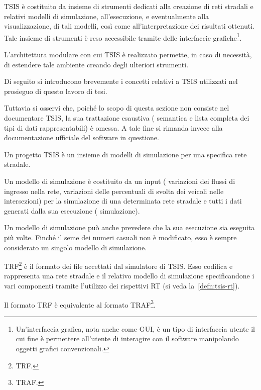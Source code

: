 \acs{TSIS} è costituito da insieme di strumenti dedicati alla creazione di reti stradali e relativi modelli di simulazione, all'esecuzione, e eventualmente alla visualizzazione, di tali modelli, così come all'interpretazione dei risultati ottenuti. Tale insieme di strumenti è reso accessibile tramite delle interfaccie grafiche\footnote{Un'interfaccia grafica, nota anche come \acf{GUI}, è un tipo di interfaccia utente il cui fine è permettere all'utente di interagire con il software manipolando oggetti grafici convenzionali.}.

L'architettura modulare con cui \acs{TSIS} è realizzato permette, in caso di necessità, di estendere tale ambiente creando degli ulteriori strumenti.

Di seguito si introducono brevemente i concetti relativi a \acs{TSIS} utilizzati nel prosieguo di questo lavoro di tesi.

Tuttavia si osservi che, poiché lo scopo di questa sezione non consiste nel documentare \acs{TSIS}, la sua trattazione esaustiva (\eg{} semantica e lista completa dei tipi di dati rappresentabili) è omessa. A tale fine si rimanda invece alla documentazione ufficiale del software in questione.

\begin{definizione}\label{defn:tsis-proj}
Un progetto \acs{TSIS} è un insieme di modelli di simulazione per una specifica rete stradale.
\end{definizione}

\begin{definizione}\label{defn:tsis-sim-model}
Un modello di simulazione è costituito da un input (\eg{} variazioni dei flussi di ingresso nella rete, variazioni delle percentuali di svolta dei veicoli nelle intersezioni) per la simulazione di una determinata rete stradale e tutti i dati generati dalla sua esecuzione (\ie{} simulazione).
\end{definizione}
\begin{osservazione}
Un modello di simulazione può anche prevedere che la sua esecuzione sia eseguita più volte. Finché il seme dei numeri casuali non è modificato, esso è sempre considerato un singolo modello di simulazione.
\end{osservazione}

\begin{definizione}\label{defn:trf-format}
\acs{TRF}\footnote{\acf{TRF}.} è il formato dei file accettati dal simulatore di \acs{TSIS}. Esso codifica e rappresenta una rete stradale e il relativo modello di simulazione specificandone i vari componenti tramite l'utilizzo dei rispettivi \acs{RT} (si veda la~\vref{defn:tsis-rt}).
\end{definizione}
\begin{osservazione}
Il formato \acs{TRF} è equivalente al formato \acs{TRAF}\footnote{\acf{TRAF}.}.
\end{osservazione}

